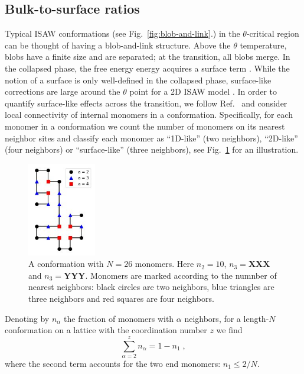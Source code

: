 \documentclass[a4paper]{jpconf}
\begin{document}
\subsection{Bulk-to-surface ratios}

Typical ISAW conformations (see Fig.\ \ref{fig:blob-and-link}.) in the
$\theta$-critical region can be thought of having a blob-and-link
structure. Above the $\theta$ temperature, blobs have a
finite size and are separated; at the transition, all blobs merge.
In the collapsed phase, the free energy energy acquires a surface term \cite{Owczarek1993}.
While the notion of a surface is only well-defined in the collapsed phase, surface-like
corrections are large around the $\theta$ point for a 2D ISAW model \cite{Grassberger1995}.
In order to quantify surface-like effects across the transition, we follow
Ref.\ \cite{faizullina2021critical} and consider local connectivity of internal
monomers in a conformation. Specifically, for each monomer in a conformation
we count the number of monomers on its nearest neighbor sites and classify
each monomer as ``1D-like'' (two neighbors), ``2D-like'' (four neighbors) or
``surface-like'' (three neighbors), see Fig.\ \ref{fig:2-3-4} for an illustration. 

\begin{figure}[!h]
\includegraphics[width=3cm, keepaspectratio=True]{Images/count.png}
\caption{A conformation with $N=26$ monomers. Here $n_2=10$, $n_3=$\textbf{XXX}
and $n_3=$\textbf{YYY}. Monomers are marked according to the numnber of nearest neighbors: 
black circles are two neighbors, blue triangles are three neighbors and red squares
are four neighbors.}
\label{fig:2-3-4}
\end{figure}


Denoting by $n_\alpha$ the fraction of monomers with $\alpha$ neighbors, 
for a length-$N$ conformation on a lattice with the coordination number $z$
we find
%
$$
\sum_{\alpha=2}^z n_\alpha = 1 - n_1 \;,
\label{eq:sum_n}
$$
%
where the second term accounts for the two end monomers: $n_1 \leqslant 2/N$.
\end{document}
